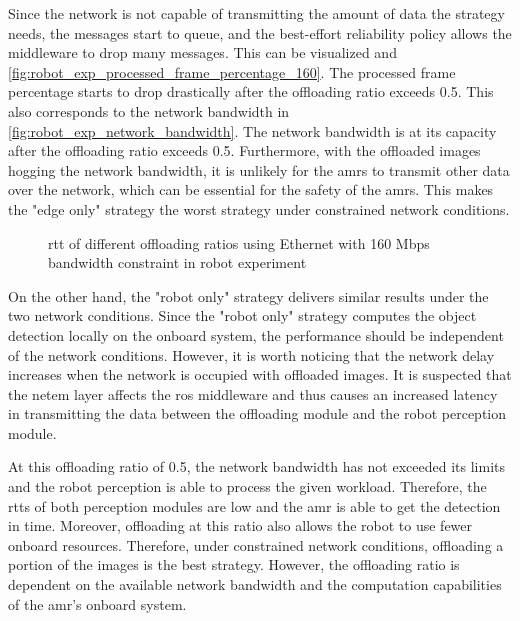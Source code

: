 Since the network is not capable of transmitting the amount of data the strategy needs, the messages start to queue, and the best-effort reliability policy allows the middleware to drop many messages. This can be visualized and \cref{fig:robot_exp_processed_frame_percentage_160}. The processed frame percentage starts to drop drastically after the offloading ratio exceeds 0.5. This also corresponds to the network bandwidth in \cref{fig:robot_exp_network_bandwidth}. The network bandwidth is at its capacity after the offloading ratio exceeds 0.5. Furthermore, with the offloaded images hogging the network bandwidth, it is unlikely for the \glspl{amr} to transmit other data over the network, which can be essential for the safety of the \glspl{amr}. This makes the "edge only" strategy the worst strategy under constrained network conditions. 

\begin{figure}
    \centering
    
    \caption{\acrshort{rtt} of different offloading ratios using Ethernet with 160 Mbps bandwidth constraint in robot experiment}
    \label{fig:robot_exp_rtt_160}
\end{figure}

On the other hand, the "robot only" strategy delivers similar results under the two network conditions. Since the "robot only" strategy computes the object detection locally on the onboard system, the performance should be independent of the network conditions. However, it is worth noticing that the network delay increases when the network is occupied with offloaded images. It is suspected that the \gls{netem} layer affects the \gls{ros} middleware and thus causes an increased latency in transmitting the data between the offloading module and the robot perception module. 

 At this offloading ratio of 0.5, the network bandwidth has not exceeded its limits and the robot perception is able to process the given workload. Therefore, the \glspl{rtt} of both perception modules are low and the \gls{amr} is able to get the detection in time. Moreover, offloading at this ratio also allows the robot to use fewer onboard resources. Therefore, under constrained network conditions, offloading a portion of the images is the best strategy. However, the offloading ratio is dependent on the available network bandwidth and the computation capabilities of the \gls{amr}'s onboard system.

